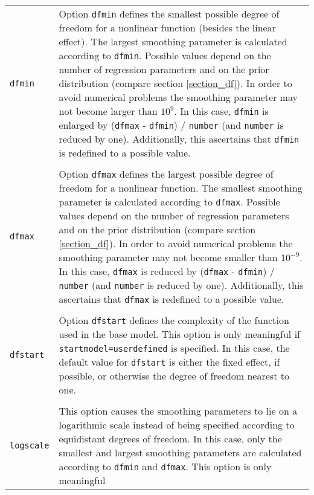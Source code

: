 \begin{longtable}{p{2.2cm} p{13.3cm}}
{\tt dfmin} & Option {\tt dfmin} defines the smallest possible degree of freedom
              for a nonlinear function (besides the linear effect).
              The largest smoothing parameter is calculated according to {\tt dfmin}.
              Possible values depend on the number of regression parameters
              and on the prior distribution
              (compare section \ref{section_df}). In order to avoid numerical problems
              the smoothing parameter may not become larger than $10^9$. In this
              case, {\tt dfmin} is enlarged by ({\tt dfmax} - {\tt dfmin}) / {\tt number}
              (and {\tt number} is reduced by one).
              Additionally, this ascertains that {\tt dfmin} is redefined to
              a possible value. \\
            & \\
{\tt dfmax} & Option {\tt dfmax} defines the largest possible degree of freedom for a
              nonlinear function. The smallest smoothing parameter is calculated
              according to {\tt dfmax}. Possible values depend on the number of regression
              parameters and on the prior distribution
              (compare section \ref{section_df}). In order to avoid numerical problems
              the smoothing parameter may not become smaller than $10^{-9}$. In this
              case, {\tt dfmax} is reduced by ({\tt dfmax} - {\tt dfmin}) / {\tt number}
              (and {\tt number} is reduced by one).
              Additionally, this ascertains that {\tt dfmax} is redefined to
              a possible value. \\
            & \\
{\tt dfstart} & Option {\tt dfstart} defines the complexity of the function used in
                the base model. This option is only meaningful if
                {\tt startmodel=userdefined} is specified. In this case, the default value for
                {\tt dfstart} is either the fixed effect, if possible, or otherwise the degree of freedom nearest to one. \\
            & \\
{\tt logscale} & This option causes the smoothing parameters to lie on a logarithmic
                 scale instead of being specified according to equidistant
                 degrees of freedom. In this case, only the smallest and largest smoothing parameters
                 are calculated according to {\tt dfmin} and {\tt dfmax}. This option is only meaningful

\end{longtable}
